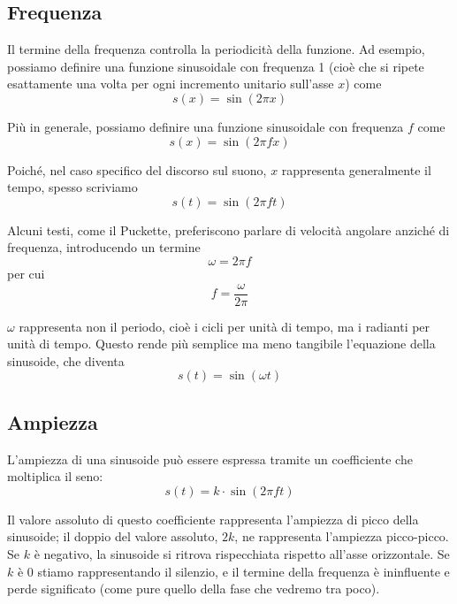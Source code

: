 \documentclass[11pt]{report}
\begin{document}
\subsection{Frequenza}

Il termine della frequenza controlla la periodicità della funzione. Ad esempio, possiamo definire una funzione sinusoidale con frequenza 1 (cioè che si ripete esattamente una volta per ogni incremento unitario sull'asse $x$) come
\begin{equation}
s(x) = \sin(2 \pi x)
\end{equation}

Più in generale, possiamo definire una funzione sinusoidale con frequenza $f$ come
\begin{equation}
s(x) = \sin({2 \pi} f x)
\end{equation}

Poiché, nel caso specifico del discorso sul suono, $x$ rappresenta generalmente il tempo, spesso scriviamo
\begin{equation}
s(t) = \sin({2 \pi} f t)
\end{equation}

Alcuni testi, come il Puckette, preferiscono parlare di velocità angolare anziché di frequenza, introducendo un termine
\begin{equation}
\omega = 2 \pi f
\end{equation}
per cui
\begin{equation}
f = \frac{\omega}{2 \pi}
\end{equation}

$\omega$ rappresenta non il periodo, cioè i cicli per unità di tempo, ma i radianti per unità di tempo. Questo rende più semplice ma meno tangibile l'equazione della sinusoide, che diventa
\begin{equation}
s(t) = \sin(\omega t)
\end{equation}


\subsection{Ampiezza}

L'ampiezza di una sinusoide può essere espressa tramite un coefficiente che moltiplica il seno:
\begin{equation}
s(t) = k \cdot \sin(2 \pi f t)
\end{equation}

Il valore assoluto di questo coefficiente rappresenta l'ampiezza di picco della sinusoide; il doppio del valore assoluto, $2k$, ne rappresenta l'ampiezza picco-picco. Se $k$ è negativo, la sinusoide si ritrova rispecchiata rispetto all'asse orizzontale. Se $k$ è 0 stiamo rappresentando il silenzio, e il termine della frequenza è ininfluente e perde significato (come pure quello della fase che vedremo tra poco).
\end{document}
